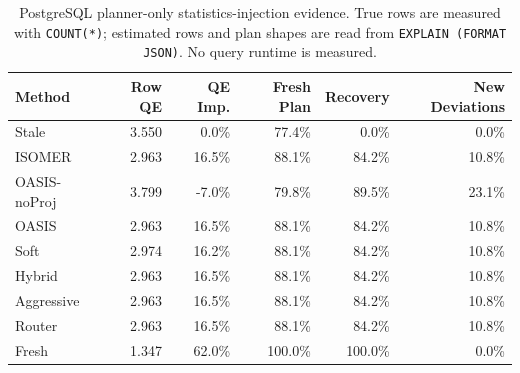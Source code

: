 \begin{table}[t]
  \centering
  \small
  \caption{PostgreSQL planner-only statistics-injection evidence. True rows are measured with \texttt{COUNT(*)}; estimated rows and plan shapes are read from \texttt{EXPLAIN (FORMAT JSON)}. No query runtime is measured.}
  \label{tab:postgres_planner_stats_injection}
  \setlength{\tabcolsep}{4pt}
  \begin{tabular}{lrrrrr}
    \toprule
    Method & Row QE & QE Imp. & Fresh Plan & Recovery & New Deviations \\
    \midrule
    Stale & 3.550 & 0.0\% & 77.4\% & 0.0\% & 0.0\% \\
    ISOMER & 2.963 & 16.5\% & 88.1\% & 84.2\% & 10.8\% \\
    OASIS-noProj & 3.799 & -7.0\% & 79.8\% & 89.5\% & 23.1\% \\
    OASIS & 2.963 & 16.5\% & 88.1\% & 84.2\% & 10.8\% \\
    Soft & 2.974 & 16.2\% & 88.1\% & 84.2\% & 10.8\% \\
    Hybrid & 2.963 & 16.5\% & 88.1\% & 84.2\% & 10.8\% \\
    Aggressive & 2.963 & 16.5\% & 88.1\% & 84.2\% & 10.8\% \\
    Router & 2.963 & 16.5\% & 88.1\% & 84.2\% & 10.8\% \\
    Fresh & 1.347 & 62.0\% & 100.0\% & 100.0\% & 0.0\% \\
    \bottomrule
  \end{tabular}
\end{table}
